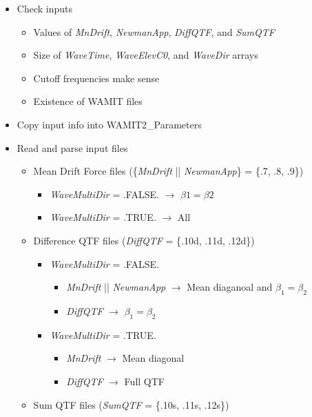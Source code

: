 \begin{itemize}
   \item{Check inputs}
   \begin{itemize}
      \item{Values of \emph{MnDrift}, \emph{NewmanApp}, \emph{DiffQTF}, and \emph{SumQTF}}
      \item{Size of \emph{WaveTime}, \emph{WaveElevC0}, and \emph{WaveDir} arrays}
      \item{Cutoff frequencies make sense}
      \item{Existence of WAMIT files}
   \end{itemize}
   \item{Copy input info into WAMIT2\_Parameters}
   \item{Read and parse input files}
   \begin{itemize}
      \item{Mean Drift Force files (\{\emph{MnDrift} || \emph{NewmanApp}\} = \{.7, .8, .9\})}
      \begin{itemize}
         \item{\emph{WaveMultiDir} = .FALSE. $\rightarrow$ $\beta1=\beta2$}
         \item{\emph{WaveMultiDir} = .TRUE. $\rightarrow$ All}
      \end{itemize}
      \item{Difference QTF files (\emph{DiffQTF} = \{.10d, .11d, .12d\})}
      \begin{itemize}
         \item{\emph{WaveMultiDir} = .FALSE.}
         \begin{itemize}
            \item{\emph{MnDrift} || \emph{NewmanApp} $\rightarrow$ Mean diaganoal and $\beta_1 = \beta_2$}
            \item{\emph{DiffQTF} $\rightarrow$ $\beta_1 = \beta_2$}
         \end{itemize}
         \item{\emph{WaveMultiDir} = .TRUE.}
         \begin{itemize}
            \item{\emph{MnDrift} $\rightarrow$   Mean diagonal}
            \item{\emph{DiffQTF} $\rightarrow$   Full QTF}
         \end{itemize}
      \end{itemize}
      \item{Sum QTF files (\emph{SumQTF} = \{.10s, .11s, .12s\})}

\end{itemize}
\end{itemize}
